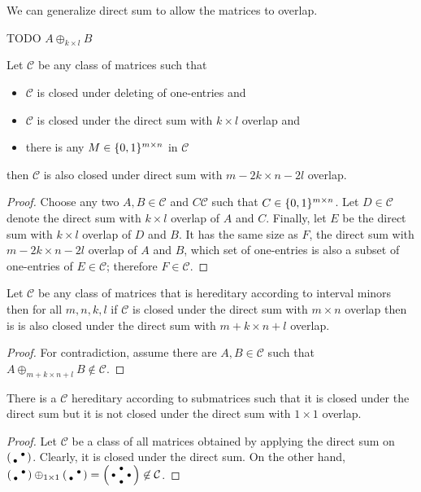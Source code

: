 We can generalize direct sum to allow the matrices to overlap.
\begin{defn}
TODO $A\oplus_{k\times l}B$
\end{defn}
\begin{thm}
Let $\mathcal{C}$ be any class of matrices such that
\begin{itemize}
\item $\mathcal{C}$ is closed under deleting of one-entries and
\item $\mathcal{C}$ is closed under the direct sum with $k\times l$ overlap and
\item there is any $M\in\{0,1\}^{m\times n}$ in $\mathcal{C}$
\end{itemize}
then $\mathcal{C}$ is also closed under direct sum with $m-2k\times n-2l$ overlap.
\end{thm}
\begin{proof}
Choose any two $A,B\in\mathcal{C}$ and $C\mathcal{C}$ such that $C\in\{0,1\}^{m\times n}$. Let $D\in\mathcal{C}$ denote the direct sum with $k\times l$ overlap of $A$ and $C$. Finally, let $E$ be the direct sum with $k\times l$ overlap of $D$ and $B$. It has the same size as $F$, the direct sum with $m-2k\times n-2l$ overlap of $A$ and $B$, which set of one-entries is also a subset of one-entries of $E\in\mathcal{C}$; therefore $F\in\mathcal{C}$.
\end{proof}
\begin{thm}
\label{hered}
Let $\mathcal{C}$ be any class of matrices that is hereditary according to interval minors then for all $m,n,k,l$ if $\mathcal{C}$ is closed under the direct sum with $m\times n$ overlap then is is also closed under the direct sum with $m+k\times n+l$ overlap.
\end{thm}
\begin{proof}
For contradiction, assume there are $A,B\in\mathcal{C}$ such that $A\oplus_{m+k\times n+l}B\not\in\mathcal{C}$.
\end{proof}
\begin{obs}
There is a $\mathcal{C}$ hereditary according to submatrices such that it is closed under the direct sum but it is not closed under the direct sum with $1\times1$ overlap.
\end{obs}
\begin{proof}
Let $\mathcal{C}$ be a class of all matrices obtained by applying the direct sum on $\left(\begin{smallmatrix} &\bullet\\\bullet& \end{smallmatrix}\right)$. Clearly, it is closed under the direct sum. On the other hand, $\left(\begin{smallmatrix} &\bullet\\\bullet& \end{smallmatrix}\right)\oplus_{1\times1}\left(\begin{smallmatrix} &\bullet\\\bullet& \end{smallmatrix}\right)=\left(\begin{smallmatrix} &\bullet& \\\bullet& &\bullet\\ &\bullet& \end{smallmatrix}\right)\not\in\mathcal{C}$.
\end{proof}
